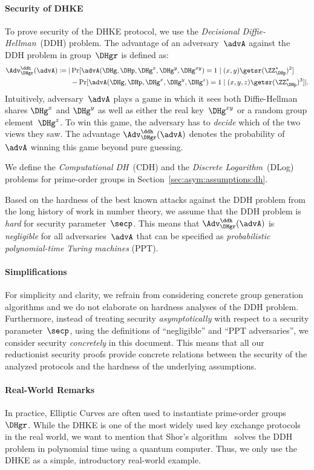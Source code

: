 \documentclass[a4paper,orivec]{llncs}
\begin{document}
\paragraph{Security of DHKE}
To prove security of the DHKE protocol, we use the \emph{Decisional Diffie-Hellman}~(DDH) problem.
The advantage of an adversary~$\advA$ against the DDH problem in group~$\DHgr$ is defined as:
\begin{align*}
    \Adv_\DHgr^\ddh(\advA)\coloneqq|&\Pr[\advA(\DHg,\DHp,\DHg^x,\DHg^y,\DHg^{xy})=1\mid (x,y)\getsr(\ZZ_\DHp^*)^2]\\
    &-\Pr[\advA(\DHg,\DHp,\DHg^x,\DHg^y,\DHg^z)=1\mid (x,y,z)\getsr(\ZZ_\DHp^*)^3]|\text{.}
\end{align*}
Intuitively, adversary~$\advA$ plays a game in which it sees both Diffie-Hellman shares $\DHg^x$ and $\DHg^y$ as well as either the real key~$\DHg^{xy}$ or a random group element~$\DHg^z$.
To win this game, the adversary has to \emph{decide} which of the two views they saw.
The advantage $\Adv_\DHgr^\ddh(\advA)$ denotes the probability of $\advA$ winning this game beyond pure guessing.

We define the \emph{Computational DH}~(CDH) and the \emph{Discrete Logarithm}~(DLog) problems for prime-order groups in Section~\ref{sec:asym:assumptions:dh}.

Based on the hardness of the best known attacks against the DDH problem from the long history of work in number theory, we assume that the DDH problem is \emph{hard} for security parameter~$\secp$.
This means that $\Adv_\DHgr^\ddh(\advA)$ is \emph{negligible} for all adversaries~$\advA$ that can be specified as \emph{probabilistic polynomial-time Turing machines} (PPT).

\paragraph{Simplifications}
For simplicity and clarity, we refrain from considering concrete group generation algorithms and we do not elaborate on hardness analyses of the DDH problem.
Furthermore, instead of treating security \emph{asymptotically} with respect to a security parameter~$\secp$, using the definitions of ``negligible'' and ``PPT adversaries'', we consider security \emph{concretely} in this document.
This means that all our reductionist security proofs provide concrete relations between the security of the analyzed protocols and the hardness of the underlying assumptions.

\paragraph{Real-World Remarks}
In practice, Elliptic Curves are often used to instantiate prime-order groups~$\DHgr$.
While the DHKE is one of the most widely used key exchange protocols in the real world, we want to mention that Shor's algorithm~\cite{FOCS:Shor94} solves the DDH problem in polynomial time using a quantum computer.
Thus, we only use the DHKE as a simple, introductory real-world example.
\end{document}
